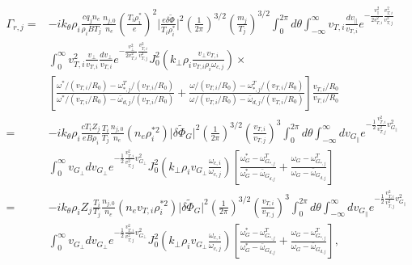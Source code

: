 \documentclass[12pt]{article}
\numberwithin{equation}{subsection}
\begin{document}
   \begin{equation}
   \begin{aligned}
      \Gamma_{r,j} =  &-ik_\theta\rho_i\frac{cq_jn_e}{\rho_iBT_j}\frac{n_{j,0}}{n_e}(\frac{T_i\rho_i^*}{e})^2\lvert\frac{e\delta\widetilde{\Phi}}{T_i\rho_i^*}\rvert^2
                      \left(\frac{1}{2\pi}\right)^{3/2}\left(\frac{m_j}{T_j}\right)^{3/2}\int_{0}^{2\pi}d\theta\int_{-\infty}^{\infty}
                      v_{T,i}\frac{dv_\parallel}{v_{T,i}}e^{-\frac{v_\parallel^2}{2v_{T,i}^2}\frac{v_{T,i}^2}{v_{T,j}^2}}\\
                      &\int_{0}^{\infty}v_{T,i}^2\frac{v_\perp}{v_{T,i}}\frac{dv_\perp}{v_{T,i}}e^{-\frac{v_\perp^2}{2v_{T,i}^2}\frac{v_{T,i}^2}{v_{T,j}^2}}
                      J_0^2(k_\perp\rho_i \frac{v_\perp v_{T,i}}{v_{T,i}\rho_i\omega_{c,j}})\times \\
                      &[\frac{\omega^*/(v_{T,i}/R_0)-\omega^T_{*,j}/(v_{T,i}/R_0)}{\omega^*/(v_{T,i}/R_0)-\bar{\omega}_{d,j}/(v_{T,i}/R_0)}
                       + \frac{\omega/(v_{T,i}/R_0)-\omega^T_{*,j}/(v_{T,i}/R_0)}{\omega/(v_{T,i}/R_0)-\bar{\omega}_{d,j}/(v_{T,i}/R_0)}]
                       \frac{v_{T,i}/R_0}{v_{T,i}/R_0} \\
                   =  &-ik_\theta\rho_i\frac{cT_iZ_j}{eB\rho_i}\frac{T_i}{T_j}\frac{n_{j,0}}{n_e}(n_e\rho_i^{*2})\lvert\delta\widetilde{\Phi}_G\rvert^2
                       \left(\frac{1}{2\pi}\right)^{3/2}\left(\frac{v_{T,i}}{v_{T,j}}\right)^3\int_{0}^{2\pi}d\theta\int_{-\infty}^{\infty}
                       dv_{G_\parallel}e^{-\frac{1}{2}\frac{v_{T,i}^2}{v_{T,j}^2}{v_{G_\parallel}^2}} \\
                      &\int_{0}^{\infty}v_{G_\perp}dv_{G_\perp}e^{-\frac{1}{2}\frac{v_{T,i}^2}{v_{T,j}^2}v_{G_\perp}^2}
                       J_0^2(k_\perp\rho_iv_{G_\perp}\frac{\omega_{c,i}}{\omega_{c,j}})
                       [\frac{\omega_G^*-\omega^T_{G_{*,j}}}{\omega_G^*-\bar{\omega}_{G_{d,j}}}
                       + \frac{\omega_G-\omega^T_{G_{*,j}}}{\omega_G-\bar{\omega}_{G_{d,j}}}] \\
                   =  &-ik_\theta\rho_iZ_j\frac{T_i}{T_j}\frac{n_{j,0}}{n_e}(n_ev_{T,i}\rho_i^{*2})\lvert\delta\widetilde{\Phi}_G\rvert^2
                       \left(\frac{1}{2\pi}\right)^{3/2}\left(\frac{v_{T,i}}{v_{T,j}}\right)^3\int_{0}^{2\pi}d\theta\int_{-\infty}^{\infty}
                       dv_{G_\parallel}e^{-\frac{1}{2}\frac{v_{T,i}^2}{v_{T,j}^2}{v_{G_\parallel}^2}} \\
                      &\int_{0}^{\infty}v_{G_\perp}dv_{G_\perp}e^{-\frac{1}{2}\frac{v_{T,i}^2}{v_{T,j}^2}v_{G_\perp}^2}
                       J_0^2(k_\perp\rho_iv_{G_\perp}\frac{\omega_{c,i}}{\omega_{c,j}})
                       [\frac{\omega_G^*-\omega^T_{G_{*,j}}}{\omega_G^*-\bar{\omega}_{G_{d,j}}}
                       + \frac{\omega_G-\omega^T_{G_{*,j}}}{\omega_G-\bar{\omega}_{G_{d,j}}}], \\
   \end{aligned}
   \end{equation}
\end{document}
